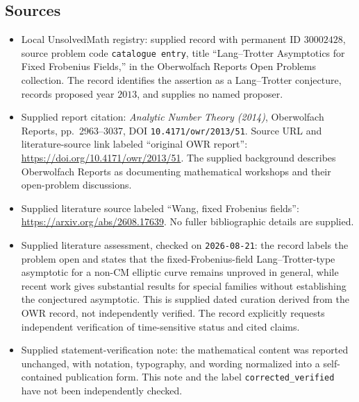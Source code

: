 \documentclass[11pt]{article}
\begin{document}
\subsection{Sources}
\begin{itemize}
\item Local UnsolvedMath registry: supplied record with permanent ID \(30002428\), source problem code \texttt{catalogue entry}, title ``Lang--Trotter Asymptotics for Fixed Frobenius Fields,'' in the Oberwolfach Reports Open Problems collection. The record identifies the assertion as a Lang--Trotter conjecture, records proposed year \(2013\), and supplies no named proposer.
\item Supplied report citation: \emph{Analytic Number Theory (2014)}, Oberwolfach Reports, pp.~2963--3037, DOI \texttt{10.4171/owr/2013/51}. Source URL and literature-source link labeled ``original OWR report'': \url{https://doi.org/10.4171/owr/2013/51}. The supplied background describes Oberwolfach Reports as documenting mathematical workshops and their open-problem discussions.
\item Supplied literature source labeled ``Wang, fixed Frobenius fields'': \url{https://arxiv.org/abs/2608.17639}. No fuller bibliographic details are supplied.
\item Supplied literature assessment, checked on \texttt{2026-08-21}: the record labels the problem open and states that the fixed-Frobenius-field Lang--Trotter-type asymptotic for a non-CM elliptic curve remains unproved in general, while recent work gives substantial results for special families without establishing the conjectured asymptotic. This is supplied dated curation derived from the OWR record, not independently verified. The record explicitly requests independent verification of time-sensitive status and cited claims.
\item Supplied statement-verification note: the mathematical content was reported unchanged, with notation, typography, and wording normalized into a self-contained publication form. This note and the label \texttt{corrected\_verified} have not been independently checked.
\end{itemize}
\end{document}
